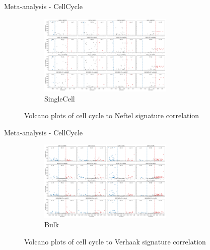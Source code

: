 \documentclass[aspectratio=169,9pt]{beamer}
\begin{document}
    \begin{frame}{Meta-analysis - CellCycle}
        \begin{adjustwidth}{-5cm}{-5cm}
            \centering
            \begin{figure}\ContinuedFloat
                \centering
                \begin{subfigure}[c]{\textwidth}
                    \centering
                    \includegraphics[width=0.7\textwidth]{volcano_SC_Nef_CC}
                    \caption{SingleCell}
                \end{subfigure}
                \caption{Volcano plots of cell cycle to Neftel signature correlation}
            \end{figure}
        \end{adjustwidth}
    \end{frame}

    \begin{frame}{Meta-analysis - CellCycle}
        \begin{adjustwidth}{-5cm}{-5cm}
            \centering
            \begin{figure}\ContinuedFloat
                \centering
                \begin{subfigure}[c]{\textwidth}
                    \centering
                    \includegraphics[width=0.7\textwidth]{volcano_Bulk_Ver_CC}
                    \caption{Bulk}
                \end{subfigure}
                \caption{Volcano plots of cell cycle to Verhaak signature correlation}
            \end{figure}
        \end{adjustwidth}
    \end{frame}
\end{document}
